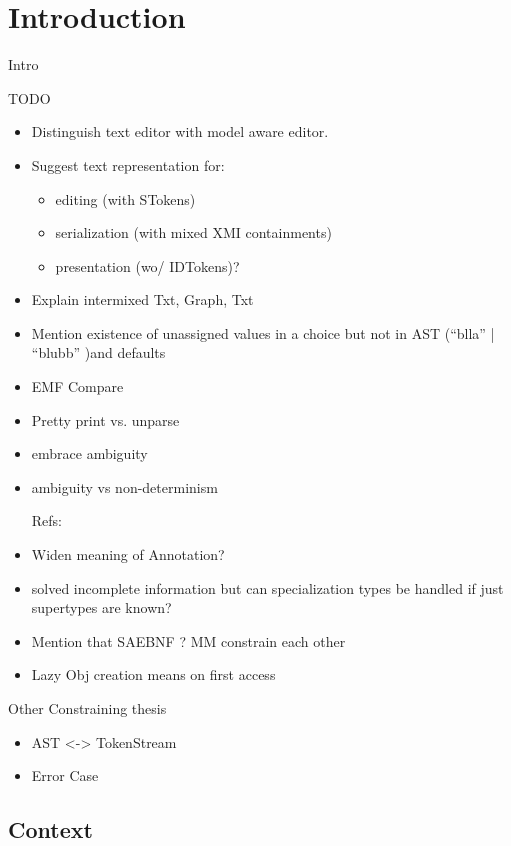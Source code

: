 \chapter{Introduction}
\label{cha:introduction}
Intro

TODO
\begin{itemize}
	\item Distinguish text editor with model aware editor.
	\item Suggest text representation for: 
	\begin{itemize}
		\item editing (with STokens)
		\item serialization (with mixed XMI containments)
		\item presentation (wo/ IDTokens)?
	\end{itemize}
	
	\item Explain intermixed Txt, Graph, Txt
	\item Mention existence of unassigned values in a choice but not in AST (``blla'' | ``blubb'' )and defaults
	\item EMF Compare
	\item Pretty print vs. unparse

	\item embrace ambiguity
	\item ambiguity vs non-determinism

	

Refs:
	\item Widen meaning of Annotation?
	\item solved incomplete information but can specialization types be handled if just supertypes are known? 
	\item Mention that SAEBNF ? MM constrain each other
	\item Lazy Obj creation means on first access
	\end{itemize}

Other Constraining thesis
\begin{itemize}
	\item AST <-> TokenStream
	\item Error Case
\end{itemize}
\section{Context}

